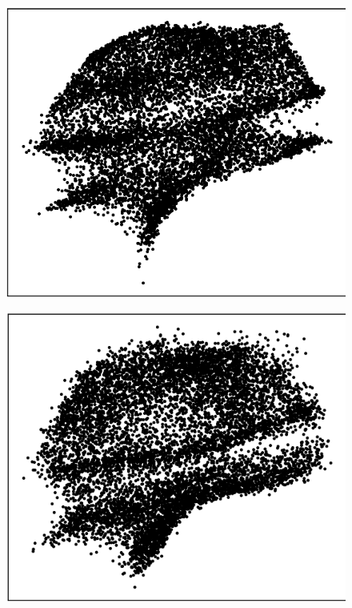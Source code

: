 \documentclass{article}
\theoremstyle{remark}
\theoremstyle{plain}
\begin{document}
{\begin{figure}[!t]
\begin{minipage}{.15\textwidth}
        \label{fig_FFJORD_rose}
    \end{minipage}
    \begin{minipage}{.15\textwidth}
        \centering
        \includegraphics[width=\textwidth]{Img_rose_OT-flow.png}
        \label{fig_OTflow_rose}
    \end{minipage}
    \begin{minipage}{.15\textwidth}
        \centering
        \includegraphics[width=\textwidth]{Img_rose_IGNN.png}

\end{minipage}
\end{figure}}
\end{document}
